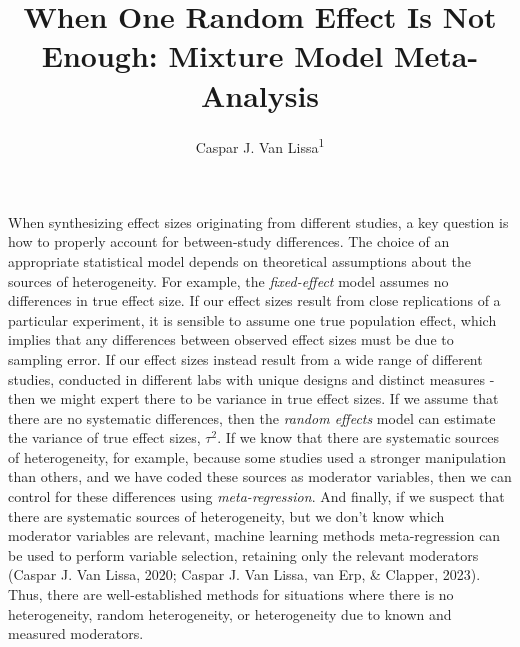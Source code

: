 \documentclass[
  english,
  man, noextraspace,floatsintext]{apa6}
\title{When One Random Effect Is Not Enough: Mixture Model Meta-Analysis}
\author{Caspar J. Van Lissa\textsuperscript{1}}
\date{}
\affiliation{\vspace{0.5cm}\textsuperscript{1} Tilburg University, dept. Methodology \& Statistics}
\begin{document}
\maketitle

When synthesizing effect sizes originating from different studies, a key question is how to properly account for between-study differences.
The choice of an appropriate statistical model depends on theoretical assumptions about the sources of heterogeneity.
For example, the \emph{fixed-effect} model assumes no differences in true effect size.
If our effect sizes result from close replications of a particular experiment, it is sensible to assume one true population effect, which implies that any differences between observed effect sizes must be due to sampling error.
If our effect sizes instead result from a wide range of different studies, conducted in different labs with unique designs and distinct measures - then we might expert there to be variance in true effect sizes.
If we assume that there are no systematic differences, then the \emph{random effects} model can estimate the variance of true effect sizes, \(\tau^2\).
If we know that there are systematic sources of heterogeneity, for example, because some studies used a stronger manipulation than others, and we have coded these sources as moderator variables, then we can control for these differences using \emph{meta-regression}.
And finally, if we suspect that there are systematic sources of heterogeneity, but we don't know which moderator variables are relevant, machine learning methods meta-regression can be used to perform variable selection, retaining only the relevant moderators (Caspar J. Van Lissa, 2020; Caspar J. Van Lissa, van Erp, \& Clapper, 2023).
Thus, there are well-established methods for situations where there is no heterogeneity, random heterogeneity, or heterogeneity due to known and measured moderators.
\end{document}
